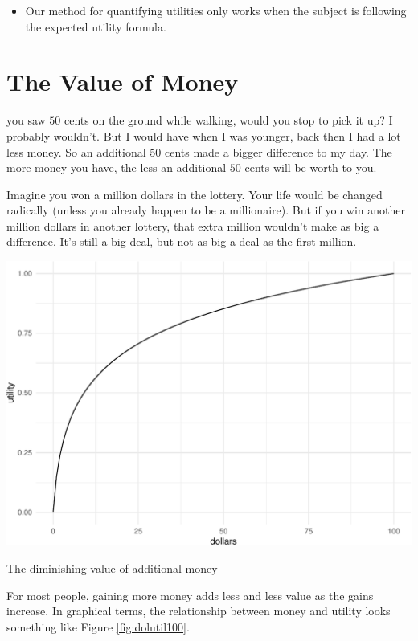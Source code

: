 \documentclass[justified]{tufte-book}
\newenvironment{warning}{\begin{itemize}\item[\faBan]}{\end{itemize}}
\theoremstyle{definition}
\theoremstyle{definition}
\theoremstyle{definition}
\theoremstyle{remark}
\begin{document}
\begin{warning}
Our method for quantifying utilities only works when the subject is
following the expected utility formula.
\end{warning}

\hypertarget{the-value-of-money}{%
\section{The Value of Money}\label{the-value-of-money}}

 you saw \(50\) cents on the ground while walking, would
you stop to pick it up? I probably wouldn't. But I would have when I was
younger, back then I had a lot less money. So an additional \(50\) cents
made a bigger difference to my day. The more money you have, the less an
additional \(50\) cents will be worth to you.

Imagine you won a million dollars in the lottery. Your life would be
changed radically (unless you already happen to be a millionaire). But
if you win another million dollars in another lottery, that extra
million wouldn't make as big a difference. It's still a big deal, but
not as big a deal as the first million.

\begin{marginfigure}
\includegraphics{_main_files/figure-latex/dolutil100-1} \caption[The diminishing value of additional money]{The diminishing value of additional money}\label{fig:dolutil100}
\end{marginfigure}

For most people, gaining more money adds less and less value as the
gains increase. In graphical terms, the relationship between money and
utility looks something like Figure \ref{fig:dolutil100}.
\end{document}
